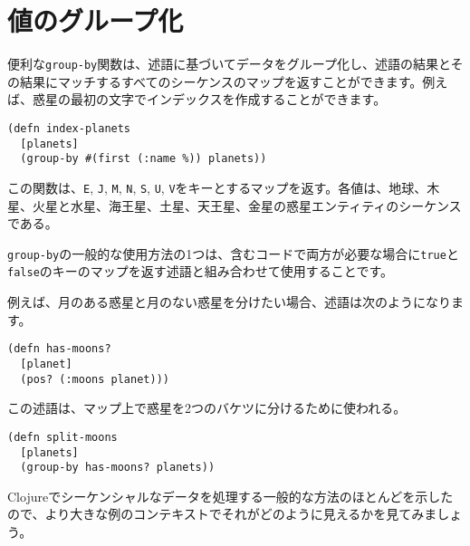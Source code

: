 \section{値のグループ化}

便利な\texttt{group-by}関数は、述語に基づいてデータをグループ化し、述語の結果とその結果にマッチするすべてのシーケンスのマップを返すことができます。例えば、惑星の最初の文字でインデックスを作成することができます。



\begin{lstlisting}[numbers=none]
(defn index-planets
  [planets]
  (group-by #(first (:name %)) planets))
\end{lstlisting}

この関数は、\texttt{E}, \texttt{J}, \texttt{M}, \texttt{N}, \texttt{S}, \texttt{U}, \texttt{V}をキーとするマップを返す。各値は、地球、木星、火星と水星、海王星、土星、天王星、金星の惑星エンティティのシーケンスである。

\texttt{group-by}の一般的な使用方法の1つは、含むコードで両方が必要な場合に\texttt{true}と\texttt{false}のキーのマップを返す述語と組み合わせて使用することです。

例えば、月のある惑星と月のない惑星を分けたい場合、述語は次のようになります。


\begin{lstlisting}[numbers=none]
(defn has-moons?
  [planet]
  (pos? (:moons planet)))
\end{lstlisting}

この述語は、マップ上で惑星を2つのバケツに分けるために使われる。


\begin{lstlisting}[numbers=none]
(defn split-moons
  [planets]
  (group-by has-moons? planets))
\end{lstlisting}

Clojureでシーケンシャルなデータを処理する一般的な方法のほとんどを示したので、より大きな例のコンテキストでそれがどのように見えるかを見てみましょう。